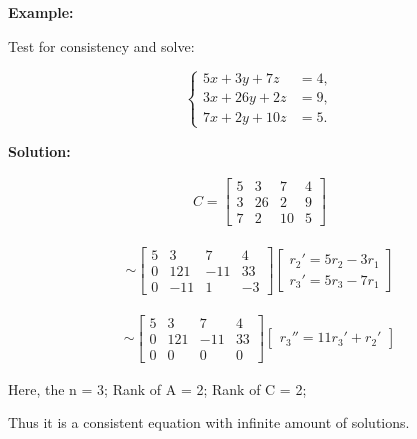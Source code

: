 \documentclass{article}
\begin{document}
\textbf{Example:}

Test for consistency and solve:

\[
\begin{cases}
5x+3y+7z &= 4, \\
3x+26y+2z &= 9, \\
7x+2y+10z &= 5.
\end{cases}
\]

\textbf{Solution:}

\begin{align*}
    C=\left[\begin{array}{ccc|c}
    5 & 3 & 7 & 4 \\
    3 & 26 & 2 & 9 \\
    7 & 2 & 10 & 5
    \end{array}\right]
\end{align*}
    
\begin{align*}
    \sim\left[\begin{array}{ccc|c}
    5 & 3 & 7 & 4 \\
    0 & 121 & -11 & 33 \\
    0 & -11 & 1 & -3
    \end{array}\right]
    \begin{bmatrix}
        r_2' = 5r_2 - 3r_1  \\ r_3' = 5r_3 - 7r_1
    \end{bmatrix}
\end{align*}

\begin{align*}
    \sim\left[\begin{array}{ccc|c}
    5 & 3 & 7 & 4 \\
    0 & 121 & -11 & 33 \\
    0 & 0 & 0 & 0
    \end{array}\right]
    \begin{bmatrix}
        r_3'' = 11r_3' + r_2' 
    \end{bmatrix}
\end{align*}

Here, the n = 3; Rank of A = 2; Rank of C = 2;

Thus it is a consistent equation with infinite amount of solutions.
\end{document}
